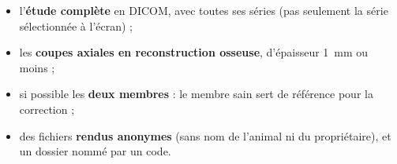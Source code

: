 \begin{aretenir}[title={Ce qu'il faut demander au vétérinaire}]
\begin{itemize}
  \item l'\textbf{étude complète} en DICOM, avec toutes ses séries (pas seulement la série sélectionnée à l'écran) ;
  \item les \textbf{coupes axiales en reconstruction osseuse}, d'épaisseur 1~mm ou moins ;
  \item si possible les \textbf{deux membres} : le membre sain sert de référence pour la correction ;
  \item des fichiers \textbf{rendus anonymes} (sans nom de l'animal ni du propriétaire), et un dossier nommé par un code.
\end{itemize}
\end{aretenir}
